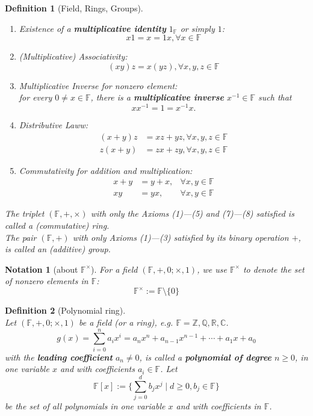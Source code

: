 \documentclass[12pt]{article}
\newtheorem{definition}{Definition}[section]
\newtheorem{notation}{Notation}[section]
\theoremstyle{definition}
\begin{document}
\begin{definition}[Field, Rings, Groups]
\begin{enumerate}[label=(\arabic*)]
\[
x+(-x)=0=(-x)+x
\]
\item Existence of a \textbf{multiplicative identity} $1_\mathbb{F}$ or simply $1$:
\[
x1=x=1x,\forall x\in\mathbb{F}
\]
\item (Multiplicative) Associativity:
\[
(xy)z=x(yz),\forall x,y,z\in\mathbb{F}
\]
\item Multiplicative Inverse for nonzero element:\\for every $0\neq x\in \mathbb{F}$, there is a \textbf{multiplicative inverse} $x^{-1}\in\mathbb{F}$ such that 
\[xx^{-1}=1=x^{-1}x.\]
\item Distributive Laww:
\[
\begin{aligned}
(x+y)z&=xz+yz,\forall x,y,z\in\mathbb{F}\\
z(x+y)&=zx+zy,\forall x,y,z\in\mathbb{F}
\end{aligned}
\]
\item Commutativity for addition and multiplication:
\[
\begin{aligned}
x+y&=y+x,&\forall x,y\in\mathbb{F}\\
xy&=yx,&\forall x,y\in\mathbb{F}
\end{aligned}
\]
\end{enumerate}
The triplet $(\mathbb{F},+,\times)$ with only the Axioms (1)---(5) and (7)---(8) satisfied is called a (commutative) ring.\\
The pair $(\mathbb{F},+)$ with only Axioms (1)---(3) satisfied by its binary operation $+$, is called an (additive) group.
\end{definition}
\begin{notation}[about $\mathbb{F}^{\times}$]\normalfont For a field $(\mathbb{F},+,0;\times, 1)$, we use $\mathbb{F}^\times$ to denote the set of nonzero elements in $\mathbb{F}$:
\[
\mathbb{F}^\times :=\mathbb{F}\setminus\{0\}
\]
\end{notation}
\begin{definition}[Polynomial ring]
\hfill\\
\normalfont Let $(\mathbb{F},+,0;\times, 1)$ be a field (or a ring), e.g. $\mathbb{F}=\mathbb{Z},\mathbb{Q},\mathbb{R},\mathbb{C}$.
\[
g(x)=\sum^n_{i=0} a_i x^i = a_n x^n + a_{n-1}x^{n-1}+\cdots+a_1 x+a_0
\]
with the \textbf{leading coefficient} $a_n\neq 0$, is called a \textbf{polynomial of degree} $n\geq 0$, in one variable $x$ and with coefficients $a_i\in\mathbb{F}$. Let
\[
\mathbb{F}[x]:=\{\sum_{j=0}^d b_j x^j\mid d\geq 0, b_j\in\mathbb{F}\}
\]
be the set of all polynomials in one variable $x$ and with coefficients in $\mathbb{F}$.
\end{definition}
\end{document}
